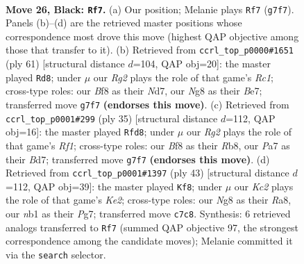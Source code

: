 \documentclass[11pt]{article}
\begin{document}
\clearpage

\begin{figure}[p]\centering
\begin{subfigure}{0.46\textwidth}\centering
\resizebox{\linewidth}{!}{%
\newchessgame
\chessboard[
  setfen={3rbbn1/p1k3r1/1p2p1p1/nP1pP1Pp/P2P1P2/7K/3N4/RNB2B1R b - - 7 26},
  showmover=false,
  pgfstyle=straightmove, color=movearrow, markmove={g7-f7}
]}
\caption{}
\end{subfigure}\hfill
\begin{subfigure}{0.46\textwidth}\centering
\resizebox{\linewidth}{!}{%
\newchessgame
\chessboard[
  setfen={2r3k1/1p1nbpp1/r1p1p1n1/7p/p1PP4/P1N2N1P/1PR2PPB/3R1K2 b - - 18 31},
  showmover=false,
  pgfstyle=straightmove, color=movearrow, markmove={c8-d8}
]}
\caption{}
\end{subfigure}
\\[4pt]
\begin{subfigure}{0.46\textwidth}\centering
\resizebox{\linewidth}{!}{%
\newchessgame
\chessboard[
  setfen={1r3rk1/pp1b1pbn/3P2p1/2pNp1Pp/4P2P/5P2/PP1RN3/2K2B1R b - - 0 18},
  showmover=false,
  pgfstyle=straightmove, color=movearrow, markmove={f8-d8}
]}
\caption{}
\end{subfigure}\hfill
\begin{subfigure}{0.46\textwidth}\centering
\resizebox{\linewidth}{!}{%
\newchessgame
\chessboard[
  setfen={r3r3/2pbknpp/pp1p4/n2P4/P2NP1P1/2PBB2P/4K3/R6R b - - 0 22},
  showmover=false,
  pgfstyle=straightmove, color=movearrow, markmove={e7-f8}
]}
\caption{}
\end{subfigure}
\caption{\textbf{Move 26, Black: \texttt{Rf7}.} (a) Our position; Melanie plays \texttt{Rf7} (\texttt{g7f7}). Panels (b)--(d) are the retrieved master positions whose correspondence most drove this move (highest QAP objective among those that transfer to it). (b) Retrieved from \texttt{ccrl\_top\_p0000\#1651} (ply 61) [structural distance $d$=104, QAP obj=20]: the master played \texttt{Rd8}; under $\mu$ our \emph{Rg2} plays the role of that game's \emph{Rc1}; cross-type roles: our \emph{B}f8 as their \emph{N}d7, our \emph{N}g8 as their \emph{B}e7; transferred move \texttt{g7f7} \textbf{(endorses this move)}. (c) Retrieved from \texttt{ccrl\_top\_p0001\#299} (ply 35) [structural distance $d$=112, QAP obj=16]: the master played \texttt{Rfd8}; under $\mu$ our \emph{Rg2} plays the role of that game's \emph{Rf1}; cross-type roles: our \emph{B}f8 as their \emph{R}b8, our \emph{P}a7 as their \emph{B}d7; transferred move \texttt{g7f7} \textbf{(endorses this move)}. (d) Retrieved from \texttt{ccrl\_top\_p0001\#1397} (ply 43) [structural distance $d$=112, QAP obj=39]: the master played \texttt{Kf8}; under $\mu$ our \emph{Kc2} plays the role of that game's \emph{Ke2}; cross-type roles: our \emph{N}g8 as their \emph{R}a8, our \emph{n}b1 as their \emph{P}g7; transferred move \texttt{c7c8}. Synthesis: 6 retrieved analogs transferred to \texttt{Rf7} (summed QAP objective 97, the strongest correspondence among the candidate moves); Melanie committed it via the \texttt{search} selector.}
\label{fig:thought-m51}
\end{figure}
\end{document}
